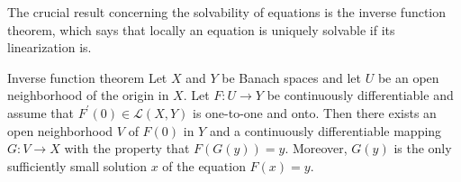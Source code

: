 The crucial result concerning the solvability of equations is the inverse function theorem, which says that locally an equation is uniquely solvable if its linearization is.

\begin{Theorem}{Inverse function theorem}
\label{thm:banach-inverse-function}
Let $X$ and $Y$ be Banach spaces and let $U$ be an open neighborhood of the origin in $X$. Let $F:U\to Y$ be continuously differentiable and assume that $F^{\prime}(0)\in\mathcal{L}(X,Y)$ is one-to-one and onto. Then there exists an open neighborhood $V$ of $F(0)$ in $Y$ and a continuously differentiable mapping $G:V\to X$ with the property that $F(G(y))=y$. Moreover, $G(y)$ is the only sufficiently small solution $x$ of the equation $F(x)=y$.
\end{Theorem}

